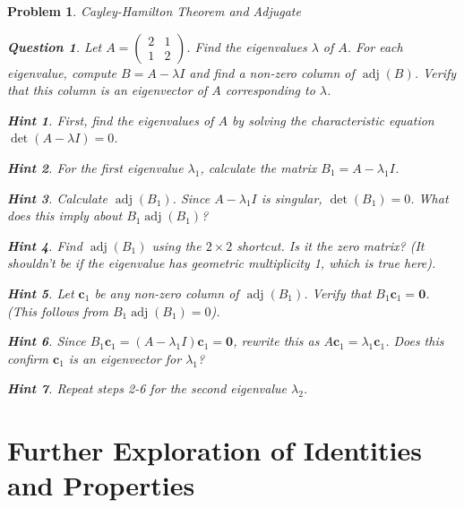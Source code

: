 \documentclass[12pt]{article}
\newtheorem{problem}{Problem}[section]
\newtheorem{question}{Question}[problem]
\theoremstyle{definition}
\newtheorem{hint}{Hint}[question]
\newcommand{\adj}{\operatorname{adj}}
\newcommand{\detm}{\operatorname{det}}
\newcommand{\vect}[1]{\mathbf{#1}} %
\begin{document}
\begin{problem}{Cayley-Hamilton Theorem and Adjugate}
    \begin{question}
        Let $A = \begin{pmatrix} 2 & 1 \\ 1 & 2 \end{pmatrix}$. Find the eigenvalues $\lambda$ of $A$. For each eigenvalue, compute $B = A - \lambda I$ and find a non-zero column of $\adj(B)$. Verify that this column is an eigenvector of $A$ corresponding to $\lambda$.
    \end{question}
    \begin{hint}
        First, find the eigenvalues of $A$ by solving the characteristic equation $\detm(A - \lambda I) = 0$.
    \end{hint}
    \begin{hint}
        For the first eigenvalue $\lambda_1$, calculate the matrix $B_1 = A - \lambda_1 I$.
    \end{hint}
    \begin{hint}
        Calculate $\adj(B_1)$. Since $A-\lambda_1 I$ is singular, $\detm(B_1)=0$. What does this imply about $B_1 \adj(B_1)$?
    \end{hint}
    \begin{hint}
        Find $\adj(B_1)$ using the $2 \times 2$ shortcut. Is it the zero matrix? (It shouldn't be if the eigenvalue has geometric multiplicity 1, which is true here).
    \end{hint}
    \begin{hint}
        Let $\vect{c}_1$ be any non-zero column of $\adj(B_1)$. Verify that $B_1 \vect{c}_1 = \vect{0}$. (This follows from $B_1 \adj(B_1) = 0$).
    \end{hint}
    \begin{hint}
        Since $B_1 \vect{c}_1 = (A - \lambda_1 I) \vect{c}_1 = \vect{0}$, rewrite this as $A \vect{c}_1 = \lambda_1 \vect{c}_1$. Does this confirm $\vect{c}_1$ is an eigenvector for $\lambda_1$?
    \end{hint}
    \begin{hint}
        Repeat steps 2-6 for the second eigenvalue $\lambda_2$.
    \end{hint}
\end{problem}

\section{Further Exploration of Identities and Properties}
\end{document}
